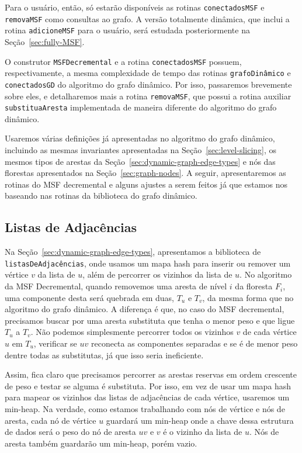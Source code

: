 Para o usuário, então, só estarão disponíveis as rotinas \texttt{conectadosMSF} e \texttt{removaMSF} como consultas ao grafo. A versão totalmente dinâmica, que inclui a rotina \texttt{adicioneMSF} para o usuário, será estudada posteriormente na Seção~\ref{sec:fully-MSF}.

O construtor \texttt{MSFDecremental} e a rotina \texttt{conectadosMSF} possuem, respectivamente, a mesma complexidade de tempo das rotinas \texttt{grafoDinâmico} e \texttt{conectadosGD} do algoritmo do grafo dinâmico. Por isso, passaremos brevemente sobre eles, e detalharemos mais a rotina \texttt{removaMSF}, que possui a rotina auxiliar \texttt{substituaAresta} implementada de maneira diferente do algoritmo do grafo dinâmico. 

Usaremos várias definições já apresentadas no algoritmo do grafo dinâmico, incluindo as mesmas invariantes apresentadas na Seção~\ref{sec:level-slicing}, os mesmos tipos de arestas da Seção~\ref{sec:dynamic-graph-edge-types} e nós das florestas apresentados na Seção~\ref{sec:graph-nodes}. A seguir, apresentaremos as rotinas do MSF decremental e alguns ajustes a serem feitos já que estamos nos baseando nas rotinas da biblioteca do grafo dinâmico. 

\subsection{Listas de Adjacências}
\label{sec:adjancency-lists-min-heap}

Na Seção~\ref{sec:dynamic-graph-edge-types}, apresentamos a biblioteca de \texttt{listasDeAdjacências}, onde usamos um mapa hash para inserir ou remover um vértice $v$ da lista de $u$, além de percorrer os vizinhos da lista de $u$. No algoritmo da MSF Decremental, quando removemos uma aresta de nível $i$ da floresta $F_i$, uma componente desta será quebrada em duas, $T_u$ e $T_v$, da mesma forma que no algoritmo do grafo dinâmico. A diferença é que, no caso do MSF decremental, precisamos buscar por uma aresta substituta que tenha o menor peso e que ligue $T_u$ a $T_v$. Não podemos simplesmente percorrer todos os vizinhos $v$ de cada vértice $u$ em $T_u$, verificar se $uv$ reconecta as componentes separadas e se é de menor peso dentre todas as substitutas, já que isso seria ineficiente.

Assim, fica claro que precisamos percorrer as arestas reservas em ordem crescente de peso e testar se alguma é substituta. Por isso, em vez de usar um mapa hash para mapear os vizinhos das listas de adjacências de cada vértice, usaremos um min-heap. Na verdade, como estamos trabalhando com nós de vértice e nós de aresta, cada nó de vértice $u$ guardará um min-heap onde a chave dessa estrutura de dados será o peso do nó de aresta $uv$ e $v$ é o vizinho da lista de $u$. Nós de aresta também guardarão um min-heap, porém vazio. 

